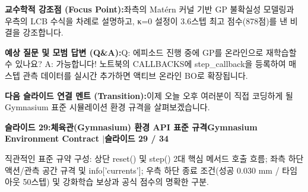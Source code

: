 \documentclass[11pt,a4paper]{article}
\begin{document}
\vspace{0.2em}
\begin{tcolorbox}[colback=lightbg,colframe=bordergray,left=6pt,right=6pt,top=3pt,bottom=3pt,boxrule=0.6pt,arc=2.5pt]
\small
\noindent\textbf{\color{navy}교수학적 강조점 (Focus Point):}\enspace 좌측의 Matérn 커널 기반 GP 불확실성 모델링과 우측의 LCB 수식을 차례로 설명하고, κ=0 설정이 3.6스텝 최고 점수(878점)를 낸 비결을 강조합니다.\par\vspace{0.3em}
\noindent\textbf{\color{successgreen}예상 질문 및 모범 답변 (Q\&A):}\enspace Q: 에피소드 진행 중에 GP를 온라인으로 재학습할 수 있나요? A: 가능합니다! 노트북의 CALLBACKS에 step\_callback을 등록하여 매 스텝 관측 데이터를 실시간 추가하면 액티브 온라인 BO로 확장됩니다.\par\vspace{0.3em}
\noindent\textbf{\color{accent}다음 슬라이드 연결 멘트 (Transition):}\enspace 이제 오늘 오후 여러분이 직접 코딩하게 될 Gymnasium 표준 시뮬레이션 환경 규격을 살펴보겠습니다.
\end{tcolorbox}
\clearpage
\hypertarget{slide.29}{}
{}
\noindent\begin{tcolorbox}[colback=navy,colframe=navy,left=6pt,right=6pt,top=3pt,bottom=3pt,boxrule=0pt,arc=2pt]
{\large\bfseries\color{white}슬라이드 29:\enspace 체육관(Gymnasium) 환경 API 표준 규격}\hfill{\footnotesize\bfseries\color{white!85!lightbg}Gymnasium Environment Contract \enspace$|$\enspace 슬라이드 29 / 34}
\end{tcolorbox}
\vspace{0.2em}
\begin{tcolorbox}[colback=lightbg,colframe=bordergray,title={\footnotesize\bfseries\color{darkgray}슬라이드 시각 구성 요약},fontupper=\small,left=6pt,right=6pt,top=2.5pt,bottom=2.5pt,boxrule=0.6pt,arc=2.5pt]
직관적인 표준 규약 구성: 상단 reset() 및 step() 2대 핵심 메서드 호출 흐름; 좌측 하단 액션/관측 공간 규격 및 info['currents']; 우측 하단 종료 조건(성공 0.030 mm / 타임아웃 50스텝) 및 강화학습 보상과 공식 점수의 명확한 구분.
\end{tcolorbox}
\vspace{0.2em}
\end{document}
